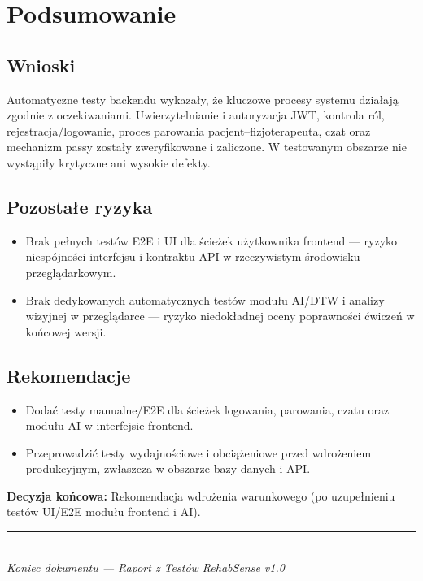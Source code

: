 \documentclass[11pt,a4paper]{article}
\begin{document}
\section{Podsumowanie}

\subsection{Wnioski}
Automatyczne testy backendu wykazały, że kluczowe procesy systemu działają zgodnie z oczekiwaniami. Uwierzytelnianie i autoryzacja JWT, kontrola ról, rejestracja/logowanie, proces parowania pacjent–fizjoterapeuta, czat oraz mechanizm passy zostały zweryfikowane i zaliczone. W testowanym obszarze nie wystąpiły krytyczne ani wysokie defekty.

\subsection{Pozostałe ryzyka}
\begin{itemize}
  \item Brak pełnych testów E2E i UI dla ścieżek użytkownika frontend — ryzyko niespójności interfejsu i kontraktu API w rzeczywistym środowisku przeglądarkowym.
  \item Brak dedykowanych automatycznych testów modułu AI/DTW i analizy wizyjnej w przeglądarce — ryzyko niedokładnej oceny poprawności ćwiczeń w końcowej wersji.
\end{itemize}

\subsection{Rekomendacje}
\begin{itemize}
  \item Dodać testy manualne/E2E dla ścieżek logowania, parowania, czatu oraz modułu AI w interfejsie frontend.
  \item Przeprowadzić testy wydajnościowe i obciążeniowe przed wdrożeniem produkcyjnym, zwłaszcza w obszarze bazy danych i API.
\end{itemize}

\vspace{0.8cm}
\noindent\textbf{Decyzja końcowa:} Rekomendacja wdrożenia warunkowego (po uzupełnieniu testów UI/E2E modułu frontend i AI). 

\vspace{1cm}
\begin{center}
\rule{0.5\textwidth}{0.4pt}\\
\small\textit{Koniec dokumentu — Raport z Testów RehabSense v1.0}
\end{center}
\end{document}
